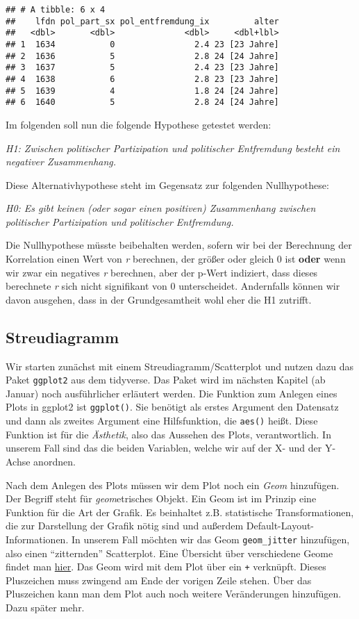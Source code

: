 \documentclass[
]{book}
\begin{document}
\begin{verbatim}
## # A tibble: 6 x 4
##    lfdn pol_part_sx pol_entfremdung_ix         alter
##   <dbl>       <dbl>              <dbl>     <dbl+lbl>
## 1  1634           0                2.4 23 [23 Jahre]
## 2  1636           5                2.8 24 [24 Jahre]
## 3  1637           5                2.4 23 [23 Jahre]
## 4  1638           6                2.8 23 [23 Jahre]
## 5  1639           4                1.8 24 [24 Jahre]
## 6  1640           5                2.8 24 [24 Jahre]
\end{verbatim}

Im folgenden soll nun die folgende Hypothese getestet werden:

\emph{H1: Zwischen politischer Partizipation und politischer Entfremdung besteht ein negativer Zusammenhang.}

Diese Alternativhypothese steht im Gegensatz zur folgenden Nullhypothese:

\emph{H0: Es gibt keinen (oder sogar einen positiven) Zusammenhang zwischen politischer Partizipation und politischer Entfremdung.}

Die Nullhypothese müsste beibehalten werden, sofern wir bei der Berechnung der Korrelation einen Wert von \emph{r} berechnen, der größer oder gleich 0 ist \textbf{oder} wenn wir zwar ein negatives \emph{r} berechnen, aber der p-Wert indiziert, dass dieses berechnete \emph{r} sich nicht signifikant von 0 unterscheidet. Andernfalls können wir davon ausgehen, dass in der Grundgesamtheit wohl eher die H1 zutrifft.

\hypertarget{streudiagramm}{%
\subsection{Streudiagramm}\label{streudiagramm}}

Wir starten zunächst mit einem Streudiagramm/Scatterplot und nutzen dazu das Paket \texttt{ggplot2} aus dem tidyverse. Das Paket wird im nächsten Kapitel (ab Januar) noch ausführlicher erläutert werden. Die Funktion zum Anlegen eines Plots in ggplot2 ist \texttt{ggplot()}. Sie benötigt als erstes Argument den Datensatz und dann als zweites Argument eine Hilfsfunktion, die \texttt{aes()} heißt. Diese Funktion ist für die \emph{Ästhetik}, also das Aussehen des Plots, verantwortlich. In unserem Fall sind das die beiden Variablen, welche wir auf der X- und der Y-Achse anordnen.

Nach dem Anlegen des Plots müssen wir dem Plot noch ein \emph{Geom} hinzufügen. Der Begriff steht für \emph{geom}etrisches Objekt. Ein Geom ist im Prinzip eine Funktion für die Art der Grafik. Es beinhaltet z.B. statistische Transformationen, die zur Darstellung der Grafik nötig sind und außerdem Default-Layout-Informationen. In unserem Fall möchten wir das Geom \texttt{geom\_jitter} hinzufügen, also einen ``zitternden'' Scatterplot. Eine Übersicht über verschiedene Geome findet man \href{https://rstudio.com/wp-content/uploads/2015/06/ggplot2-german.pdf}{hier}. Das Geom wird mit dem Plot über ein \texttt{+} verknüpft. Dieses Pluszeichen muss zwingend am Ende der vorigen Zeile stehen. Über das Pluszeichen kann man dem Plot auch noch weitere Veränderungen hinzufügen. Dazu später mehr.
\end{document}
